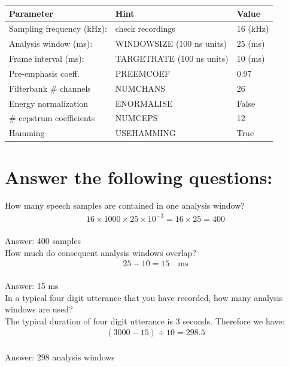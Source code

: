\documentclass[onecolumn]{article}
\begin{document}
\begin{tabular}{|l|l|l|}
\hline
Parameter & Hint & Value \\ \hline
Sampling frequency (kHz): & check recordings          & \hfill 16 (kHz) \\
Analysis window (ms):     & WINDOWSIZE (100 ns units) & \hfill 25 (ms) \\
Frame interval (ms):      & TARGETRATE (100 ns units) & \hfill 10 (ms) \\
Pre-emphasis coeff.       & PREEMCOEF                 &  0.97 \\
Filterbank \# channels    & NUMCHANS                  &  26  \\
Energy normalization      & ENORMALISE                &  False  \\
\# cepstrum coefficients  & NUMCEPS                   &  12  \\
Hamming                   & USEHAMMING                &  True  \\
\hline
\end{tabular}

\section*{Answer the following questions:}
How many speech samples are contained in one analysis window?
\\
\begin{align*}
    16 \times 1000 \times 25 \times  10^{-3} = 16 \times  25
    = 400
\end{align*}
\\
Answer: 400 samples
\\[3mm]
How much do consequent analysis windows overlap?
\\
\begin{align*}
    25 - 10 = 15 \quad \text{ms}
\end{align*}
\\
Answer: 15 ms
\\[3mm]
In a typical four digit utterance that you have recorded, how many analysis windows are used?
\\
The typical duration of four digit utterance is 3 seconds.
Therefore we have:
\begin{align*}
    (3000 - 15) \div 10 = 298.5
\end{align*}
\\
Answer: 298 analysis windows
\\[1mm]
\end{document}
